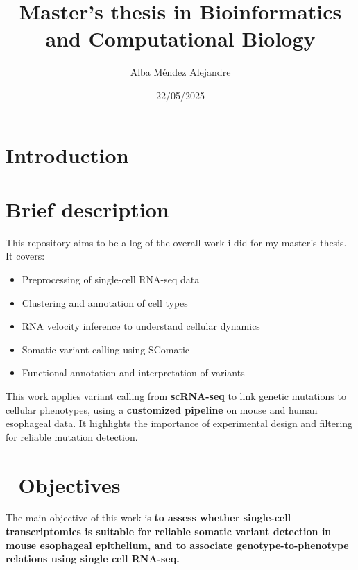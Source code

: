 \documentclass[
  letterpaper,
  DIV=11,
  numbers=noendperiod]{scrreprt}
\title{Master's thesis in Bioinformatics and Computational Biology}
\author{Alba Méndez Alejandre}
\date{22/05/2025}
\providecommand{\tightlist}{%
  \setlength{\itemsep}{0pt}\setlength{\parskip}{0pt}}\usepackage{longtable,booktabs,array}
\renewcommand*\contentsname{Table of contents}
\newcommand\contentsname{Table of contents}
\begin{document}
\maketitle

\renewcommand*\contentsname{Table of contents}
{
\hypersetup{linkcolor=}
\setcounter{tocdepth}{2}
\tableofcontents
}


\chapter{Introduction}\label{introduction}


\chapter*{Brief description}\label{brief-description}


This repository aims to be a log of the overall work i did for my
master's thesis. It covers:

\begin{itemize}
\tightlist
\item
  Preprocessing of single-cell RNA-seq data
\item
  Clustering and annotation of cell types
\item
  RNA velocity inference to understand cellular dynamics
\item
  Somatic variant calling using SComatic
\item
  Functional annotation and interpretation of variants
\end{itemize}

This work applies variant calling from \textbf{scRNA-seq} to link
genetic mutations to cellular phenotypes, using a \textbf{customized
pipeline} on mouse and human esophageal data. It highlights the
importance of experimental design and filtering for reliable mutation
detection.


\chapter{🎯 Objectives}\label{objectives}

The main objective of this work is \textbf{to assess whether single-cell
transcriptomics is suitable for reliable somatic variant detection in
mouse esophageal epithelium, and to associate genotype-to-phenotype
relations using single cell RNA-seq.}
\end{document}
